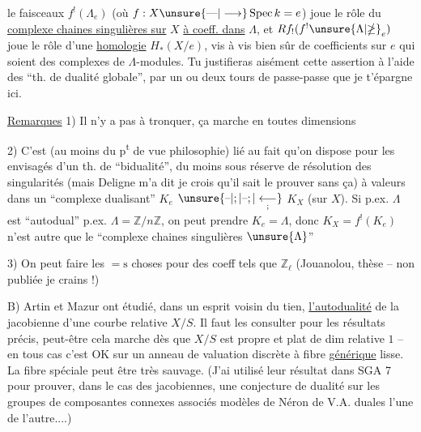 %
le  faisceaux $f^!(\Lambda_e)$ (où $f:X\unsure{\text{---}|\longrightarrow}\operatorname{Spec} k=e$) joue le rôle du \uline{complexe  chaines singulières sur} $X$ \uline{à coeff. dans} $\Lambda$, et $Rf_!(f^!{\unsure{\Lambda|\mathbb{\Lambda}}}_e)$ joue le rôle d'une \uline{homologie} $H_*(X/e)$, vis à vis bien sûr de coefficients sur $e$ qui soient des complexes de $\Lambda$-modules. Tu justifieras aisément cette assertion à l'aide des ``th. de dualité globale'', par un ou deux tours de passe-passe que je t'épargne ici.

\uline{Remarques} 1) Il n'y a pas à tronquer, ça marche en toutes dimensions

2) C'est (au moins du p\textsuperscript{t} de vue philosophie) lié au fait qu'on dispose pour les  envisagés  d'un th. de ``bidualité''\unsure{\deleted{)}|\textsuperscript{(*)}}, du moins sous réserve de résolution des singularités (mais Deligne m'a dit je crois qu'il sait le prouver sans ça) à valeurs dans un ``complexe dualisant'' $K_e$  $\unsure{\text{--}|;|\text{--};|\underset{\text{;}}{\longleftarrow}}$ $K_X$ (sur $X$). Si p.ex. $\Lambda$ est ``autodual''  p.ex. $\Lambda=\mathbb{Z}/n\mathbb{Z}$, on peut prendre $K_e=\Lambda$, donc  $K_X=f^!(K_e)$ n'est autre que le ``complexe  chaines singulières    $\unsure{\Lambda}$'' 

3) On peut faire les ${=}\mathrm{s}$ choses pour des coeff tels que $\mathbb{Z}_{\ell}$ (Jouanolou, thèse -- non publiée je crains !)


B) Artin et Mazur ont étudié, dans un esprit voisin du tien, \uline{l'autodualité} de la jacobienne d'une courbe relative $X/S$. Il faut les consulter pour les résultats précis, peut-être cela marche dès que $X/S$ est propre et plat de dim relative $1$ -- en tous cas c'est OK sur un anneau de valuation discrète à fibre \uline{générique} lisse. La fibre spéciale peut être très sauvage. (J'ai utilisé leur résultat dans SGA 7 pour prouver, dans le cas des jacobiennes, une conjecture de dualité sur les groupes de composantes connexes associés   modèles de Néron de V.A. duales l'une de l'autre....)

